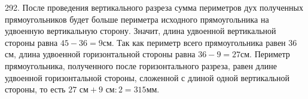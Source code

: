 292. После проведения вертикального разреза сумма периметров дух полученных прямоугольников будет больше периметра исходного прямоугольника на удвоенную вертикальную сторону. Значит, длина удвоенной вертикальной стороны равна $45-36=9$см. Так как периметр всего прямоугольника равен 36 см, длина удвоенной горизонтальной стороны равна $36-9=27$см. Периметр прямоугольника, полученного после горизонтального разреза, равен длине удвоенной горизонтальной стороны, сложенной с длиной одной вертикальной стороны, то есть $27\text{ см}+9\text{ см}:2=315$мм.\\
